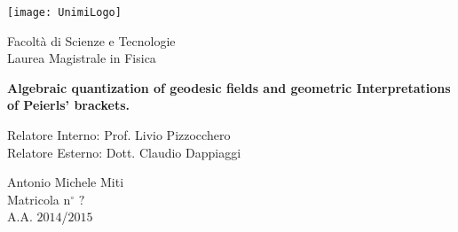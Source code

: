 {
\thispagestyle{empty}

\centerline{
\texttt{[image: UnimiLogo]}
}

\begin{center}
{\Large Facoltà di Scienze e Tecnologie\\
\vskip0.2cm Laurea Magistrale in Fisica }
\end{center}


\vskip1.5cm
\begin{center}
{\huge \textbf{Algebraic quantization of geodesic fields and geometric Interpretations of Peierls' brackets.}}
\end{center}

{\large
\vskip20mm Relatore Interno:  Prof. Livio Pizzocchero \\
						Relatore Esterno: Dott. Claudio Dappiaggi
}

\vskip2cm
\hskip9cm\parbox[t]{7cm}
{\large 
Antonio Michele Miti\\
Matricola n$^\circ$ $?$\\
A.A. $2014$/$2015$\\
}

\newpage
\newpage
\thispagestyle{empty}
\clearpage
}

